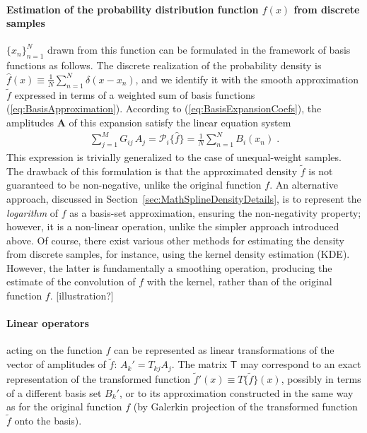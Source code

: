 \documentclass[12pt]{article}
\begin{document}
\paragraph{Estimation of the probability distribution function $f(x)$ from discrete samples} $\{x_n\}_{n=1}^{N}$ drawn from this function can be formulated in the framework of basis functions as follows. The discrete realization of the probability density is $\hat f(x) \equiv \frac{1}{N} \sum_{n=1}^{N} \delta(x-x_n)$, and we identify it with the smooth approximation $\tilde f$ expressed in terms of a weighted sum of basis functions (\ref{eq:BasisApproximation}). According to (\ref{eq:BasisExpansionCoefs}), the amplitudes $\boldsymbol A$ of this expansion satisfy the linear equation system
\begin{align}
\sum_{j=1}^M G_{ij}\, A_j = \mathcal{P}_i \{\hat f\} = \frac{1}{N} \sum_{n=1}^{N} B_i(x_n) \;.
\end{align}
This expression is trivially generalized to the case of unequal-weight samples.\\
The drawback of this formulation is that the approximated density $\tilde f$ is not guaranteed to be non-negative, unlike the original function $f$. An alternative approach, discussed in Section~\ref{sec:MathSplineDensityDetails}, is to represent the \textit{logarithm} of $f$ as a basis-set approximation, ensuring the non-negativity property; however, it is a non-linear operation, unlike the simpler approach introduced above. Of course, there exist various other methods for estimating the density from discrete samples, for instance, using the kernel density estimation (KDE). However, the latter is fundamentally a smoothing operation, producing the estimate of the convolution of $f$ with the kernel, rather than of the original function $f$. [illustration?]

\paragraph{Linear operators} acting on the function $f$ can be represented as linear transformations of the vector of amplitudes of $\tilde f$: $A_k' = T_{kj} A_j$. The matrix $\mathsf T$ may correspond to an exact representation of the transformed function $\tilde f'(x) \equiv T\{\tilde f\}(x)$, possibly in terms of a different basis set $B_k'$, or to its approximation constructed in the same way as for the original function $f$ (by Galerkin projection of the transformed function $\tilde f$ onto the basis).
\end{document}
